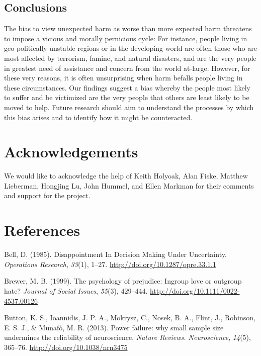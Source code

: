 \documentclass[10pt, letterpaper]{article}
\begin{document}
\subsection{Conclusions}\label{conclusions}

The bias to view unexpected harm as worse than more expected harm
threatens to impose a vicious and morally pernicious cycle: For
instance, people living in geo-politically unstable regions or in the
developing world are often those who are most affected by terrorism,
famine, and natural disasters, and are the very people in greatest need
of assistance and concern from the world at-large. However, for these
very reasons, it is often unsurprising when harm befalls people living
in these circumstances. Our findings suggest a bias whereby the people
most likely to suffer and be victimized are the very people that others
are least likely to be moved to help. Future research should aim to
understand the processes by which this bias arises and to identify how
it might be counteracted.

\section{Acknowledgements}\label{acknowledgements}

We would like to acknowledge the help of Keith Holyoak, Alan Fiske,
Matthew Lieberman, Hongjing Lu, John Hummel, and Ellen Markman for their
comments and support for the project.

\section{References}\label{references}

\setlength{\parindent}{-0.1in} \setlength{\leftskip}{0.125in} \noindent

\hypertarget{refs}{}
\hypertarget{ref-Bell1985}{}
Bell, D. (1985). Disappointment In Decision Making Under Uncertainty.
\emph{Operations Research}, \emph{33}(1), 1--27.
\url{http://doi.org/10.1287/opre.33.1.1}

\hypertarget{ref-Brewer1999}{}
Brewer, M. B. (1999). The psychology of prejudice: Ingroup love or
outgroup hate? \emph{Journal of Social Issues}, \emph{55}(3), 429--444.
\url{http://doi.org/10.1111/0022-4537.00126}

\hypertarget{ref-Button2013}{}
Button, K. S., Ioannidis, J. P. A., Mokrysz, C., Nosek, B. A., Flint,
J., Robinson, E. S. J., \& Munafò, M. R. (2013). Power failure: why
small sample size undermines the reliability of neuroscience.
\emph{Nature Reviews. Neuroscience}, \emph{14}(5), 365--76.
\url{http://doi.org/10.1038/nrn3475}
\end{document}
